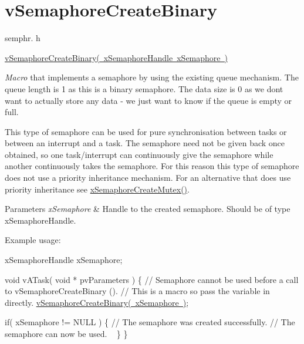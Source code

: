 \hypertarget{group__v_semaphore_create_binary}{}\section{v\+Semaphore\+Create\+Binary}
\label{group__v_semaphore_create_binary}
semphr. h 
\begin{DoxyPre}\mbox{\hyperlink{semphr_8h_ae10bffadd26fbd5bcce76bf33a83ef30}{vSemaphoreCreateBinary( xSemaphoreHandle xSemaphore )}}\end{DoxyPre}


{\itshape Macro} that implements a semaphore by using the existing queue mechanism. The queue length is 1 as this is a binary semaphore. The data size is 0 as we don\textquotesingle{}t want to actually store any data -\/ we just want to know if the queue is empty or full.

This type of semaphore can be used for pure synchronisation between tasks or between an interrupt and a task. The semaphore need not be given back once obtained, so one task/interrupt can continuously \textquotesingle{}give\textquotesingle{} the semaphore while another continuously \textquotesingle{}takes\textquotesingle{} the semaphore. For this reason this type of semaphore does not use a priority inheritance mechanism. For an alternative that does use priority inheritance see \mbox{\hyperlink{semphr_8h_aa6a00aa9b91a9e5b3ebe4ae1c3f115c6}{x\+Semaphore\+Create\+Mutex()}}.


\begin{DoxyParams}{Parameters}
{\em x\+Semaphore} & Handle to the created semaphore. Should be of type x\+Semaphore\+Handle.\\
\hline
\end{DoxyParams}
Example usage\+: 
\begin{DoxyPre}
xSemaphoreHandle xSemaphore;\end{DoxyPre}



\begin{DoxyPre}void vATask( void * pvParameters )
\{
   // Semaphore cannot be used before a call to vSemaphoreCreateBinary ().
   // This is a macro so pass the variable in directly.
   \mbox{\hyperlink{semphr_8h_ae10bffadd26fbd5bcce76bf33a83ef30}{vSemaphoreCreateBinary( xSemaphore )}};\end{DoxyPre}



\begin{DoxyPre}   if( xSemaphore != NULL )
   \{
       // The semaphore was created successfully.
       // The semaphore can now be used.  
~\newline
   \}
\}
\end{DoxyPre}
 